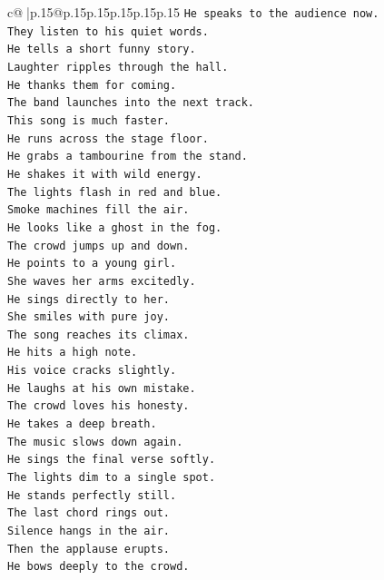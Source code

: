 \documentclass{article}
\begin{document}
{\begin{supertabular}{c@{$\;$}|p{.15\linewidth}@{}p{.15\linewidth}p{.15\linewidth}p{.15\linewidth}p{.15\linewidth}p{.15\linewidth}}
{{{\texttt{He speaks to the audience now.} \\
\texttt{They listen to his quiet words.} \\
\texttt{He tells a short funny story.} \\
\texttt{Laughter ripples through the hall.} \\
\texttt{He thanks them for coming.} \\
\texttt{The band launches into the next track.} \\
\texttt{This song is much faster.} \\
\texttt{He runs across the stage floor.} \\
\texttt{He grabs a tambourine from the stand.} \\
\texttt{He shakes it with wild energy.} \\
\texttt{The lights flash in red and blue.} \\
\texttt{Smoke machines fill the air.} \\
\texttt{He looks like a ghost in the fog.} \\
\texttt{The crowd jumps up and down.} \\
\texttt{He points to a young girl.} \\
\texttt{She waves her arms excitedly.} \\
\texttt{He sings directly to her.} \\
\texttt{She smiles with pure joy.} \\
\texttt{The song reaches its climax.} \\
\texttt{He hits a high note.} \\
\texttt{His voice cracks slightly.} \\
\texttt{He laughs at his own mistake.} \\
\texttt{The crowd loves his honesty.} \\
\texttt{He takes a deep breath.} \\
\texttt{The music slows down again.} \\
\texttt{He sings the final verse softly.} \\
\texttt{The lights dim to a single spot.} \\
\texttt{He stands perfectly still.} \\
\texttt{The last chord rings out.} \\
\texttt{Silence hangs in the air.} \\
\texttt{Then the applause erupts.} \\
\texttt{He bows deeply to the crowd.} \\
}}}
\end{supertabular}}
\end{document}
